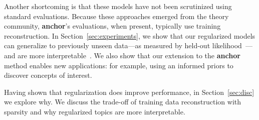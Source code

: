 Another shortcoming is that these models have not been scrutinized
using standard  evaluations.  Because these approaches
emerged from the theory community, {\bf anchor}'s evaluations, when
present, typically use training reconstruction.  In
Section~\ref{sec:experiments}, we show that our regularized models can
generalize to previously unseen data---as measured by held-out
likelihood~\cite{blei-03}---and are more
interpretable~\cite{chang-09b,newman-10}.  We also show that our
extension to the {\bf anchor} method enables new applications: for
example, using an informed priors to discover concepts of interest.

Having shown that regularization does improve performance,
in Section~\ref{sec:disc} we explore why.  We discuss the trade-off
of training data reconstruction with sparsity and why regularized
topics are more interpretable.
